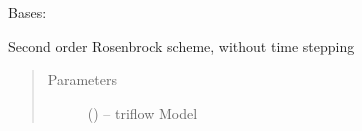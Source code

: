 \documentclass[letterpaper,10pt,english]{sphinxmanual}
\begin{document}
\begin{fulllineitems}
\begin{quote}
\begin{description}
\begin{itemize}
\end{itemize}

\end{description}\end{quote}

\end{fulllineitems}


\begin{fulllineitems}
\label{\detokenize{triflow.plugins:triflow.plugins.schemes.ROS2}}
Bases: {\hyperref[\detokenize{triflow.plugins:triflow.plugins.schemes.ROW_general}]{}}

Second order Rosenbrock scheme, without time stepping
\begin{quote}\begin{description}
\item[{Parameters}] \leavevmode
{} () -- triflow Model

\end{description}\end{quote}

\end{fulllineitems}

\end{document}
